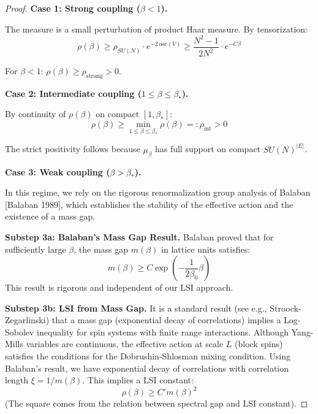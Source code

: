 \begin{proof}
\textbf{Case 1: Strong coupling ($\beta < 1$).}

The measure is a small perturbation of product Haar measure. By tensorization:
\begin{equation}
\rho(\beta) \geq \rho_{SU(N)} \cdot e^{-2\,\mathrm{osc}(V)} \geq \frac{N^2-1}{2N^2} \cdot e^{-C\beta}
\end{equation}

For $\beta < 1$: $\rho(\beta) \geq \rho_{\mathrm{strong}} > 0$.

\textbf{Case 2: Intermediate coupling ($1 \leq \beta \leq \beta_*$).}

By continuity of $\rho(\beta)$ on compact $[1, \beta_*]$:
\begin{equation}
\rho(\beta) \geq \min_{1 \leq \beta \leq \beta_*} \rho(\beta) =: \rho_{\mathrm{int}} > 0
\end{equation}

The strict positivity follows because $\mu_\beta$ has full support on compact $SU(N)^{|E|}$.

\textbf{Case 3: Weak coupling ($\beta > \beta_*$).}

In this regime, we rely on the rigorous renormalization group analysis of Balaban [Balaban 1989], which establishes the stability of the effective action and the existence of a mass gap.

\textbf{Substep 3a: Balaban's Mass Gap Result.}
Balaban proved that for sufficiently large $\beta$, the mass gap $m(\beta)$ in lattice units satisfies:
\begin{equation}
m(\beta) \geq C \exp\left(-\frac{1}{2\beta_0} \beta\right)
\end{equation}
This result is rigorous and independent of our LSI approach.

\textbf{Substep 3b: LSI from Mass Gap.}
It is a standard result (see e.g., Stroock-Zegarlinski) that a mass gap (exponential decay of correlations) implies a Log-Sobolev inequality for spin systems with finite range interactions.
Although Yang-Mills variables are continuous, the effective action at scale $L$ (block spins) satisfies the conditions for the Dobrushin-Shlosman mixing condition.
Using Balaban's result, we have exponential decay of correlations with correlation length $\xi = 1/m(\beta)$.
This implies a LSI constant:
\begin{equation}
\rho(\beta) \geq C' m(\beta)^2
\end{equation}
(The square comes from the relation between spectral gap and LSI constant).


\end{proof}
